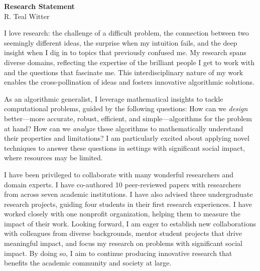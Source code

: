 \documentclass[11pt]{article}
\begin{document}
\begin{center}
	\Large \textbf{Research Statement} \\
	\vspace{.25em}
	\large{R. {\color{teal}Teal} Witter}
\end{center}

I love research: the challenge of a difficult problem, the connection between two seemingly different ideas, the surprise when my intuition fails, and the deep insight when I dig in to topics that previously confused me.
My research spans diverse domains, reflecting the expertise of the brilliant people I get to work with and the questions that fascinate me.
This interdisciplinary nature of my work enables the cross-pollination of ideas and fosters innovative algorithmic solutions.

As an algorithmic generalist, I leverage mathematical insights to tackle computational problems, guided by the following questions:
How can we \textit{design} better---more accurate, robust, efficient, and simple---algorithms for the problem at hand?
How can we \textit{analyze} these algorithms to mathematically understand their properties and limitations?
I am particularly excited about applying novel techniques to answer these questions in settings with significant social impact, where resources may be limited.

I have been privileged to collaborate with many wonderful researchers and domain experts.
I have co-authored 10 peer-reviewed papers with researchers from across seven academic institutions.
I have also advised three undergraduate research projects, guiding four students in their first research experiences.
I have worked closely with one nonprofit organization, helping them to measure the impact of their work.
Looking forward, I am eager to establish new collaborations with colleagues from diverse backgrounds, mentor student projects that drive meaningful impact, and focus my research on problems with significant social impact.
By doing so, I aim to continue producing innovative research that benefits the academic community and society at large.

\end{document}
